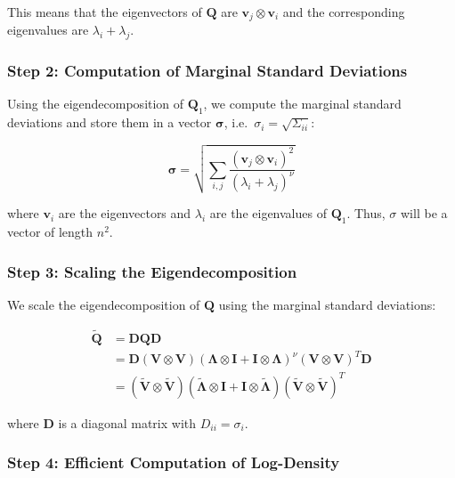 \documentclass[journal=,manuscript=]{achemso}
\begin{document}
This means that the eigenvectors of \(\mathbf{Q}\) are
\(\mathbf{v}_j \otimes \mathbf{v}_i\) and the corresponding eigenvalues
are \(\lambda_i + \lambda_j\).

\subsubsection{Step 2: Computation of Marginal Standard
Deviations}\label{step-2-computation-of-marginal-standard-deviations}

Using the eigendecomposition of \(\mathbf{Q}_1\), we compute the
marginal standard deviations and store them in a vector
\(\mathbf{\sigma}\), i.e.~\(\sigma_i = \sqrt{\Sigma_{ii}}\):

\[
\mathbf{\sigma} = \sqrt{\sum_{i,j} \frac{(\mathbf{v}_j \otimes \mathbf{v}_i)^2}{(\lambda_i + \lambda_j)^\nu}}
\]

where \(\mathbf{v}_i\) are the eigenvectors and \(\lambda_i\) are the
eigenvalues of \(\mathbf{Q}_1\). Thus, \(\sigma\) will be a vector of
length \(n^2\).

\subsubsection{Step 3: Scaling the
Eigendecomposition}\label{step-3-scaling-the-eigendecomposition}

We scale the eigendecomposition of \(\mathbf{Q}\) using the marginal
standard deviations:

\[
\begin{aligned}
\mathbf{\widetilde  Q} &= \mathbf{D}\mathbf{Q}\mathbf{D} \\
&= \mathbf{D}(\mathbf{V} \otimes \mathbf{V})(\mathbf{\Lambda} \otimes \mathbf{I} + \mathbf{I} \otimes \mathbf{\Lambda})^\nu(\mathbf{V} \otimes \mathbf{V})^T\mathbf{D} \\
&= (\mathbf{\widetilde V} \otimes \mathbf{\widetilde V})(\mathbf{\widetilde\Lambda} \otimes \mathbf{I} + \mathbf{I} \otimes \mathbf{\widetilde \Lambda})(\mathbf{\widetilde V} \otimes \mathbf{\widetilde V})^T
\end{aligned}
\]

where \(\mathbf{D}\) is a diagonal matrix with \(D_{ii} = \sigma_i\).

\subsubsection{Step 4: Efficient Computation of
Log-Density}\label{step-4-efficient-computation-of-log-density}
\end{document}

